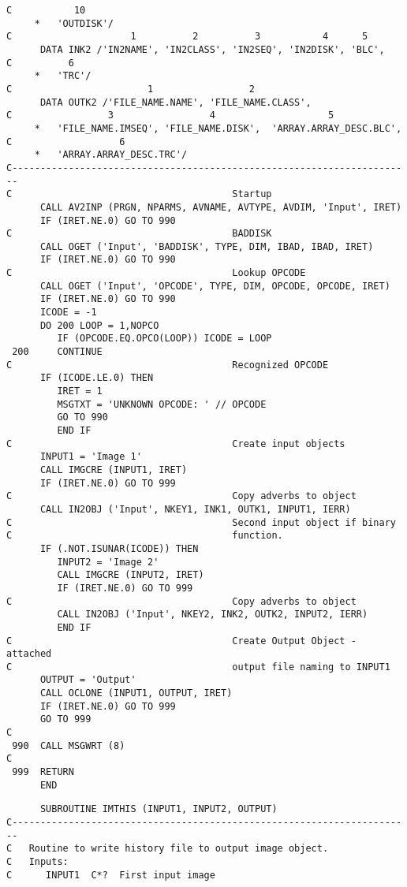 {\begin{verbatim}
C           10
     *   'OUTDISK'/
C                     1          2          3           4      5
      DATA INK2 /'IN2NAME', 'IN2CLASS', 'IN2SEQ', 'IN2DISK', 'BLC',
C          6
     *   'TRC'/
C                        1                 2
      DATA OUTK2 /'FILE_NAME.NAME', 'FILE_NAME.CLASS',
C                 3                 4                    5
     *   'FILE_NAME.IMSEQ', 'FILE_NAME.DISK',  'ARRAY.ARRAY_DESC.BLC',
C                   6
     *   'ARRAY.ARRAY_DESC.TRC'/
C-----------------------------------------------------------------------
C                                       Startup
      CALL AV2INP (PRGN, NPARMS, AVNAME, AVTYPE, AVDIM, 'Input', IRET)
      IF (IRET.NE.0) GO TO 990
C                                       BADDISK
      CALL OGET ('Input', 'BADDISK', TYPE, DIM, IBAD, IBAD, IRET)
      IF (IRET.NE.0) GO TO 990
C                                       Lookup OPCODE
      CALL OGET ('Input', 'OPCODE', TYPE, DIM, OPCODE, OPCODE, IRET)
      IF (IRET.NE.0) GO TO 990
      ICODE = -1
      DO 200 LOOP = 1,NOPCO
         IF (OPCODE.EQ.OPCO(LOOP)) ICODE = LOOP
 200     CONTINUE
C                                       Recognized OPCODE
      IF (ICODE.LE.0) THEN
         IRET = 1
         MSGTXT = 'UNKNOWN OPCODE: ' // OPCODE
         GO TO 990
         END IF
C                                       Create input objects
      INPUT1 = 'Image 1'
      CALL IMGCRE (INPUT1, IRET)
      IF (IRET.NE.0) GO TO 999
C                                       Copy adverbs to object
      CALL IN2OBJ ('Input', NKEY1, INK1, OUTK1, INPUT1, IERR)
C                                       Second input object if binary
C                                       function.
      IF (.NOT.ISUNAR(ICODE)) THEN
         INPUT2 = 'Image 2'
         CALL IMGCRE (INPUT2, IRET)
         IF (IRET.NE.0) GO TO 999
C                                       Copy adverbs to object
         CALL IN2OBJ ('Input', NKEY2, INK2, OUTK2, INPUT2, IERR)
         END IF
C                                       Create Output Object - attached
C                                       output file naming to INPUT1
      OUTPUT = 'Output'
      CALL OCLONE (INPUT1, OUTPUT, IRET)
      IF (IRET.NE.0) GO TO 999
      GO TO 999
C
 990  CALL MSGWRT (8)
C
 999  RETURN
      END
\end{verbatim}
\begin{verbatim}
      SUBROUTINE IMTHIS (INPUT1, INPUT2, OUTPUT)
C-----------------------------------------------------------------------
C   Routine to write history file to output image object.
C   Inputs:
C      INPUT1  C*?  First input image

\end{verbatim}}
